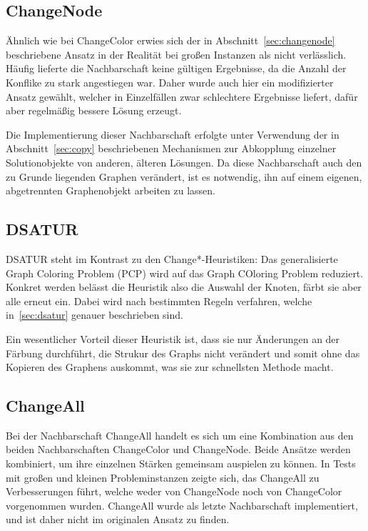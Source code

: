 \subsection{ChangeNode}
Ähnlich wie bei ChangeColor erwies sich der in Abschnitt~\ref{sec:changenode} beschriebene Ansatz in der Realität bei großen Instanzen als nicht verlässlich. Häufig lieferte die Nachbarschaft keine gültigen
Ergebnisse, da die Anzahl der Konflike zu stark angestiegen war. Daher wurde auch hier ein modifizierter Ansatz gewählt, welcher in Einzelfällen zwar schlechtere Ergebnisse liefert, dafür aber regelmäßig
bessere Lösung erzeugt.

Die Implementierung dieser Nachbarschaft erfolgte unter Verwendung der in Abschnitt~\ref{sec:copy} beschriebenen Mechanismen zur Abkopplung einzelner Solutionobjekte von anderen, älteren Lösungen. Da diese 
Nachbarschaft auch den zu Grunde liegenden Graphen verändert, ist es notwendig, ihn auf einem eigenen, abgetrennten Graphenobjekt arbeiten zu lassen. 

\subsection{DSATUR}
DSATUR steht im Kontrast zu den Change*-Heuristiken: Das generalisierte Graph Coloring Problem (PCP) wird auf das Graph COloring Problem reduziert. Konkret werden belässt die Heuristik also die Auswahl der Knoten, färbt sie aber alle erneut ein. Dabei wird nach bestimmten Regeln verfahren, welche in~\ref{sec:dsatur} genauer beschrieben sind.

Ein wesentlicher Vorteil dieser Heuristik ist, dass sie nur Änderungen an der Färbung durchführt, die Strukur des Graphs nicht verändert und somit ohne das Kopieren des Graphens auskommt, was sie zur schnellsten Methode macht.

\subsection{ChangeAll}
Bei der Nachbarschaft ChangeAll handelt es sich um eine Kombination aus den beiden Nachbarschaften ChangeColor und ChangeNode. Beide Ansätze werden kombiniert, um ihre einzelnen Stärken gemeinsam auspielen
zu können. In Tests mit großen und kleinen Probleminstanzen zeigte sich, das ChangeAll zu Verbesserungen führt, welche weder von ChangeNode noch von ChangeColor vorgenommen wurden. ChangeAll wurde als letzte
Nachbarschaft implementiert, und ist daher nicht im originalen Ansatz zu finden.

